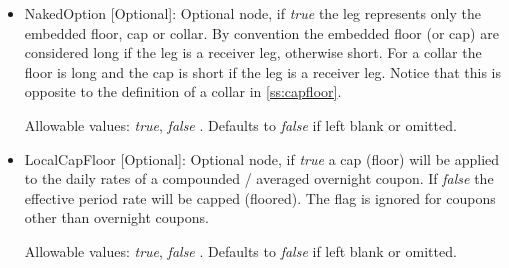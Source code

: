 \begin{itemize}
\item NakedOption [Optional]: Optional node, if \emph{true} the leg represents only the embedded floor, cap or collar.
  By convention the embedded floor (or cap) are considered long if the leg is a receiver leg, otherwise short. For a
  collar the floor is long and the cap is short if the leg is a receiver leg. Notice that this is opposite to
  the definition of a collar in \ref{ss:capfloor}.

 Allowable values: \emph{true}, \emph{false} . Defaults to \emph{false} if left blank or omitted.

\item LocalCapFloor [Optional]: Optional node, if \emph{true} a cap (floor) will be applied to the daily rates of a
  compounded / averaged overnight coupon. If \emph{false} the effective period rate will be capped (floored). The flag
  is ignored for coupons other than overnight coupons.

 Allowable values: \emph{true}, \emph{false} . Defaults to \emph{false} if left blank or omitted.

\end{itemize}
